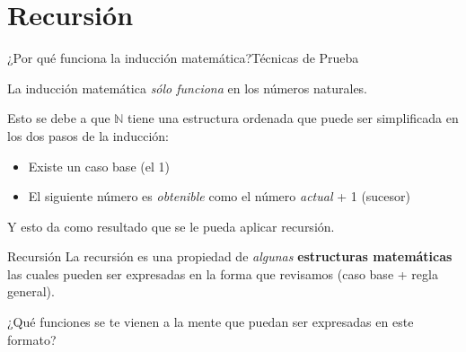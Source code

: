 \documentclass[spanish, c]{beamer}
\begin{document}
\section{Recursión}

\begin{frame}{¿Por qué funciona la inducción matemática?}{Técnicas de Prueba}
    
    La inducción matemática \textit{sólo funciona} en los números naturales. \pause

    \bigskip

    Esto se debe a que $\mathbb{N}$ tiene una \alert{estructura ordenada} que puede ser simplificada en los dos pasos de la inducción: \pause
    
    \begin{itemize}
        \item Existe un caso base (el 1) \pause
        \item El siguiente número es \textit{obtenible} como el número \textit{actual} + 1 (sucesor) \pause
    \end{itemize}

    Y esto da como resultado que se le pueda aplicar \alert{recursión}.
\end{frame}

\begin{frame}{Recursión}
    La \alert{recursión} es una propiedad de \textit{algunas} \textbf{estructuras matemáticas} las cuales pueden ser expresadas en la forma que revisamos (caso base + regla general). \pause

    \bigskip

    \begin{center}
        ¿Qué funciones se te vienen a la mente que puedan ser expresadas en este formato?
    \end{center}
\end{frame}



\end{document}
